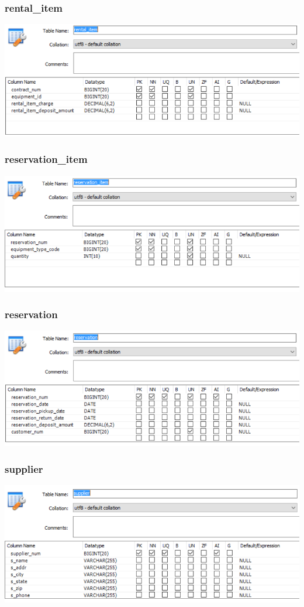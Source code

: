 \documentclass[12pt]{article}
\begin{document}
\subsubsection*{rental\_item} \includegraphics[scale=0.55]{screenshots/structure/rental_item.PNG} \\
\subsubsection*{reservation\_item} \includegraphics[scale=0.55]{screenshots/structure/reservation_item.PNG} \\
\subsubsection*{reservation} \includegraphics[scale=0.55]{screenshots/structure/reservation.PNG} \\
\subsubsection*{supplier} \includegraphics[scale=0.55]{screenshots/structure/supplier.PNG} \\
\end{document}
